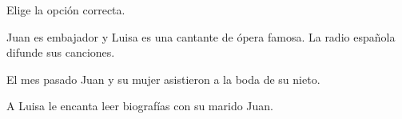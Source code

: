 
\begin{question}

\begin{instance}
    
\begin{mcq}[standalone=false]
      
\begin{stem}
        Elige la opción correcta.\par
        Juan es embajador y Luisa es una cantante de ópera famosa. La radio española difunde sus canciones.\par
                El mes pasado Juan y su mujer asistieron a la boda de su nieto.\par
                A Luisa le encanta leer biografías con su marido Juan.\par
\end{stem}
      
\begin{distractors}
\end{distractors}
                
\end{mcq}
  
\end{instance}

\end{question}
